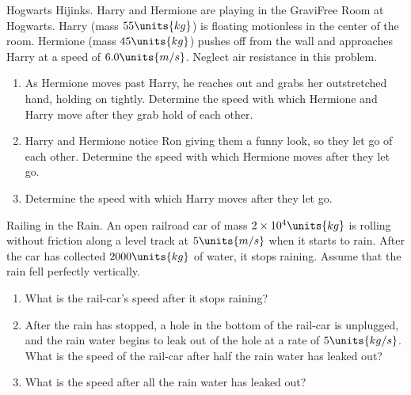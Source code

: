 \begin{aproblem}{Hogwarts Hijinks.}
  Harry and Hermione are playing in the GraviFree Room at Hogwarts.
  Harry (mass $55\units{kg}$) is floating motionless in the center
  of the room.  Hermione (mass $45\units{kg}$) pushes off from the
  wall and approaches Harry at a speed of $6.0\units{m/s}$.  Neglect
  air resistance in this problem.
  \begin{enumerate}
  \item As Hermione moves past Harry, he reaches out and grabs her
    outstretched hand, holding on tightly.  Determine the speed with
    which Hermione and Harry move after they grab hold of each other.
 
  \item Harry and Hermione notice Ron giving them a funny look, so
    they let go of each other.  Determine the speed with which
    Hermione moves after they let go.

  \item Determine the speed with which Harry moves after they let go.
     
  \end{enumerate}
  \label{prob:hogwarts}
\end{aproblem}


\begin{aproblem}{Railing in the Rain.}
  An open railroad car of mass $2\times 10^4\units{kg}$ is rolling
  without friction along a level track at $5\units{m/s}$ when it
  starts to rain.  After the car has collected $2000\units{kg}$ of
  water, it stops raining.  Assume that the rain fell perfectly
  vertically.
  \begin{enumerate}
  \item What is the rail-car's speed after it stops raining?

  \item After the rain has stopped, a hole in the bottom of the
    rail-car is unplugged, and the rain water begins to leak out of
    the hole at a rate of $5\units{kg/s}$.  What is the speed of the
    rail-car after half the rain water has leaked out?

  \item What is the speed after all the rain water has leaked out?
  \end{enumerate}
\end{aproblem}



